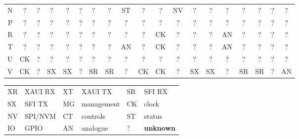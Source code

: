\documentclass[10pt,a4paper]{article}
\begin{document}
\begin{landscape}
{\begin{tabular}{@{}r|*{18}{c}@{}}
N & \cellcolor{clun}? & \cellcolor{clun}? & \cellcolor{clun}? & \cellcolor{clun}? & \cellcolor{clun}? & \cellcolor{clun}? & \cellcolor{clun}? & \cellcolor{clst}ST & \cellcolor{clun}? & \cellcolor{clun}? & \cellcolor{clnv}NV & \cellcolor{clun}? & \cellcolor{clun}? & \cellcolor{clun}? & \cellcolor{clun}? & \cellcolor{clun}? & \cellcolor{clun}? & \cellcolor{clun}?\\
P & \cellcolor{clun}? & \cellcolor{clun}? & \cellcolor{clun}? & \cellcolor{clun}? & \cellcolor{clun}? & \cellcolor{clun}? & \cellcolor{clun}? & \cellcolor{clun}? & \cellcolor{clun}? & \cellcolor{clun}? & \cellcolor{clun}? & \cellcolor{clun}? & \cellcolor{clun}? & \cellcolor{clun}? & \cellcolor{clun}? & \cellcolor{clun}? & \cellcolor{clun}? & \cellcolor{clun}?\\
R & \cellcolor{clun}? & \cellcolor{clun}? & \cellcolor{clun}? & \cellcolor{clun}? & \cellcolor{clun}? & \cellcolor{clun}? & \cellcolor{clun}? & \cellcolor{clun}? & \cellcolor{clun}? & \cellcolor{clck}CK & \cellcolor{clun}? & \cellcolor{clun}? & \cellcolor{clun}? & \cellcolor{clan}AN & \cellcolor{clun}? & \cellcolor{clun}? & \cellcolor{clun}? & \cellcolor{clun}?\\
T & \cellcolor{clun}? & \cellcolor{clun}? & \cellcolor{clun}? & \cellcolor{clun}? & \cellcolor{clun}? & \cellcolor{clun}? & \cellcolor{clun}? & \cellcolor{clan}AN & \cellcolor{clun}? & \cellcolor{clck}CK & \cellcolor{clun}? & \cellcolor{clun}? & \cellcolor{clun}? & \cellcolor{clan}AN & \cellcolor{clun}? & \cellcolor{clun}? & \cellcolor{clun}? & \cellcolor{clun}?\\
U & \cellcolor{clck}CK & \cellcolor{clun}? & \cellcolor{clun}? & \cellcolor{clun}? & \cellcolor{clun}? & \cellcolor{clun}? & \cellcolor{clun}? & \cellcolor{clun}? & \cellcolor{clun}? & \cellcolor{clun}? & \cellcolor{clun}? & \cellcolor{clun}? & \cellcolor{clun}? & \cellcolor{clun}? & \cellcolor{clun}? & \cellcolor{clun}? & \cellcolor{clun}? & \cellcolor{clun}?\\
V & \cellcolor{clck}CK & \cellcolor{clun}? & \cellcolor{clsx}SX & \cellcolor{clsx}SX & \cellcolor{clun}? & \cellcolor{clsr}SR & \cellcolor{clsr}SR & \cellcolor{clun}? & \cellcolor{clck}CK & \cellcolor{clck}CK & \cellcolor{clun}? & \cellcolor{clsx}SX & \cellcolor{clsx}SX & \cellcolor{clun}? & \cellcolor{clsr}SR & \cellcolor{clsr}SR & \cellcolor{clun}? & \cellcolor{clan}AN\\
\bottomrule\end{tabular}}
\vspace{3mm}\par
\begin{tabularx}{\linewidth}{@{}llllll@{}}
\cellcolor{clrx}XR & XAUI RX & \cellcolor{cltx}XT & XAUI TX & \cellcolor{clsr}SR & SFI RX \\
\cellcolor{clsx}SX & SFI TX & \cellcolor{clmg}MG & management & \cellcolor{clck}CK & clock \\
\cellcolor{clnv}NV & SPI/NVM & \cellcolor{clct}CT & controls & \cellcolor{clst}ST & status \\
\cellcolor{clio}IO & GPIO & \cellcolor{clan}AN & analogue & \cellcolor{clun}? & \textbf{unknown}\\
\end{tabularx}
\end{landscape}
\end{document}
